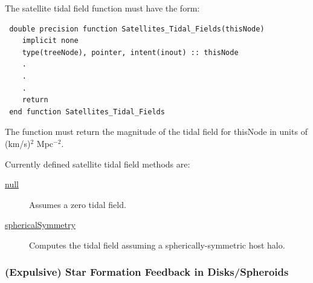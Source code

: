 The satellite tidal field function must have the form:
\begin{verbatim}
 double precision function Satellites_Tidal_Fields(thisNode)
    implicit none
    type(treeNode), pointer, intent(inout) :: thisNode
    .
    .
    .
    return
 end function Satellites_Tidal_Fields
\end{verbatim}
The function must return the magnitude of the tidal field for {\normalfont \ttfamily thisNode} in units of (km/s)$^2$ Mpc$^{-2}$.

Currently defined satellite tidal field methods are:
\begin{description}
 \item [\hyperlink{satellites.tidal_fields.null.F90:satellites_tidal_fields_null}{{\normalfont \ttfamily null}}] Assumes a zero tidal field.
 \item [\hyperlink{satellites.tidal_fields.spherical_symmetry.F90:satellites_tidal_fields_spherical_symmetry}{{\normalfont \ttfamily sphericalSymmetry}}] Computes the tidal field assuming a spherically-symmetric host halo.
\end{description}

\subsubsection{(Expulsive) Star Formation Feedback in Disks/Spheroids}

